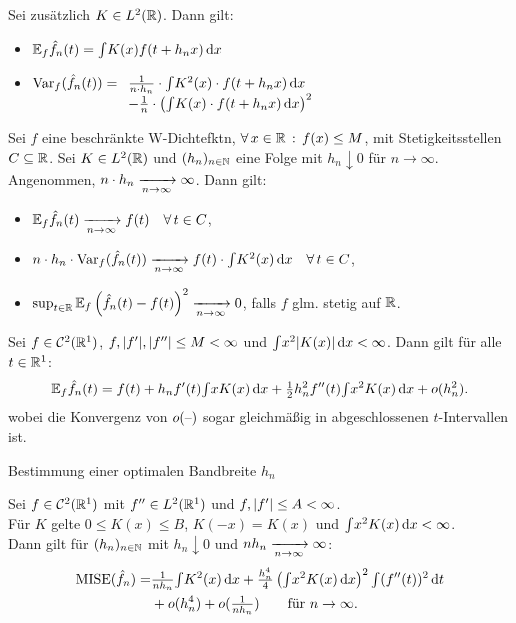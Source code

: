 \documentclass{cheat-sheet}
\newcommand{\E}{\mathbb{E}} %
\newcommand{\Cont}{\mathcal{C}} %
\DeclareMathOperator{\MISE}{MISE} %
\DeclareMathOperator{\var}{Var} %
\begin{document}
\begin{lem}
  Sei zusätzlich $K \in L^2(\mathbb{R})$.
  Dann gilt:
  \begin{itemize}
    \item $\E_f \hat{f}_n(t) = \IInt{K(x) f(t + h_n x)}{x}$
    \item
    $\var_f (\hat{f}_n(t)) = 
    \begin{array}[t]{l}
      \tfrac{1}{n \cdot h_n} \cdot \IInt{K^2(x) \cdot f(t + h_n x)}{x} \\
      - \tfrac{1}{n} \cdot \left( \IInt{K(x) \cdot f(t + h_n x)}{x} \right)^2
    \end{array}$
  \end{itemize}
\end{lem}

\begin{satz}
  Sei $f$ eine beschränkte W-Dichtefktn, $\forall \, {x \in \mathbb{R}} \,:\, f(x) \leq M$, mit Stetigkeitsstellen $C \subseteq \mathbb{R}$.
  Sei $K \in L^2(\mathbb{R})$ und $(h_n)_{n \in \mathbb{N}}$ eine Folge mit $h_n \downarrow 0$ für $n \to \infty$.
  Angenommen, $n \cdot h_n \xrightarrow[n \to \infty]{} \infty$.
  Dann gilt:
  \begin{itemize}
    \item $\E_f \hat{f}_n(t) \xra[n \to \infty]{} f(t) \quad \forall \, t \in C$,
    \item $n \cdot h_n \cdot \var_f (\hat{f}_n(t)) \xra[n \to \infty]{} f(t) \cdot \IInt{K^2(x)}{x} \quad \forall \, t \in C$,
    \item $\sup_{t \in \R} \E_f \left( \hat{f}_n(t) - f(t) \right)^2 \xra[n \to \infty]{} 0$, falls $f$ glm. stetig auf $\mathbb{R}$.
  \end{itemize}
\end{satz}

\begin{satz}
  Sei $f \in \Cont^2(\R^1)$, $f, \lvert f'\rvert, \lvert f''\rvert \leq M < \infty$ und ${\textstyle \int} x^2 \lvert K(x)\rvert \,\mathrm{d} x < \infty$.
  Dann gilt für alle $t \in \mathbb{R}^1$:
  \[
    \E_f \hat{f}_n(t) = f(t) + h_n f'(t) \IInt{x K(x)}{x} + \tfrac{1}{2} h_n^2 f''(t) \IInt{x^2 K(x)}{x} + o(h_n^2).
  \]
  wobei die Konvergenz von $o(\text{--})$ sogar gleichmäßig in abgeschlossenen $t$-Intervallen ist.
\end{satz}

\begin{ziel}
  Bestimmung einer optimalen Bandbreite $h_n$
\end{ziel}

\begin{satz}
  Sei $f \in \Cont^2(\R^1)$ mit $f'' \in L^2(\mathbb{R}^1)$ und $f, \lvert f'\rvert \leq A < \infty$. \\
  Für $K$ gelte $0 \leq K(x) \leq B$, $K(-x) = K(x)$ und ${\textstyle \int} x^2 K(x) \,\mathrm{d} x < \infty$. \\
  Dann gilt für $(h_n)_{n \in \mathbb{N}}$ mit $h_n \downarrow 0$ und $n h_n \xrightarrow[n \to \infty]{} \infty$:
  \begin{align*}
    \MISE(\hat{f}_n) = & \tfrac{1}{n h_n} \IInt{K^2(x)}{x} + \tfrac{h_n^4}{4} \left( \IInt{x^2 K(x)}{x} \right)^2 \IInt{(f''(t))^2}{t} \\
    & + o(h_n^4) + o(\tfrac{1}{n h_n}) \qquad
    \text{für } n \to \infty.
  \end{align*}
\end{satz}
\end{document}
